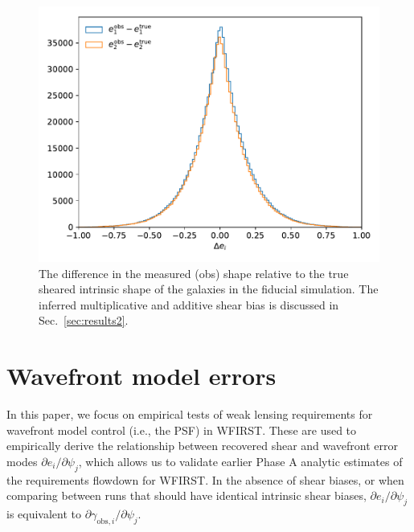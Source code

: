 \documentclass[usenatbib]{mnras}
\begin{document}
\begin{figure}
\begin{center}
\includegraphics[width=\columnwidth]{figures/shape_hist.pdf}
\end{center}
\caption[]{
The difference in the measured (obs) shape relative to the true sheared intrinsic shape of the galaxies in the fiducial simulation. The inferred multiplicative and additive shear bias is discussed in Sec.~\ref{sec:results2}. 
\label{fig:shape_hist}}
\end{figure}

\section{Wavefront model errors}\label{sec:results}

In this paper, we focus on empirical tests of weak lensing requirements for wavefront model control (i.e., the PSF) in WFIRST. These are used to empirically derive the relationship between recovered shear and wavefront error modes $\partial e_i / \partial \psi_j$, which allows us to validate earlier Phase A analytic estimates of the requirements flowdown for WFIRST. In the absence of shear biases, or when comparing between runs that should have identical intrinsic shear biases, $\partial e_i / \partial \psi_j$ is equivalent to $\partial \gamma_{\mathrm{obs},i} / \partial \psi_j$.
\end{document}
